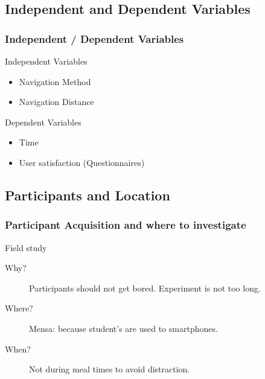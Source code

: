 \documentclass{beamer}
\begin{document}
\subsection{Independent and Dependent Variables}
\begin{frame}
        \frametitle{Independent / Dependent Variables}
        \begin{block}{Independent Variables}
                \begin{itemize}
                        \item Navigation Method
                        \item Navigation Distance
                \end{itemize}
        \end{block}
        \begin{block}{Dependent Variables}
                \begin{itemize}
                        \item Time
                        \item User satisfaction (Questionnaires)
                \end{itemize}
        \end{block}
\end{frame}

\subsection{Participants and Location}
\begin{frame}
        \frametitle{Participant Acquisition and where to investigate}
        \begin{block}{Field study}
                \begin{description}
                        \item[Why?] Participants should not get bored.
                                Experiment is not too long.
                        \item[Where?] Mensa: because student's are used to smartphones.
                        \item[When?] Not during meal times to avoid distraction.
                \end{description}
        \end{block}
\end{frame}
\end{document}
